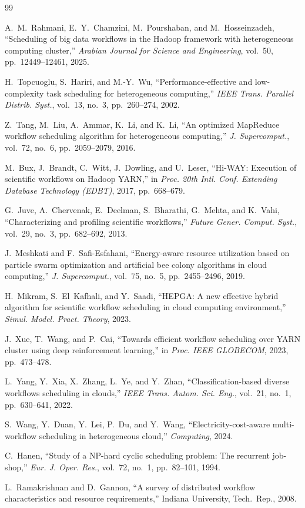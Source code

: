 \documentclass[12pt,a4paper]{article}
\begin{document}
\newpage
\begin{thebibliography}{99}

 A.~M.~Rahmani, E.~Y.~Chamzini, M.~Pourshaban, and M.~Hosseinzadeh, ``Scheduling of big data workflows in the Hadoop framework with heterogeneous computing cluster,'' \textit{Arabian Journal for Science and Engineering}, vol.~50, pp.~12449--12461, 2025.

 H.~Topcuoglu, S.~Hariri, and M.-Y.~Wu, ``Performance-effective and low-complexity task scheduling for heterogeneous computing,'' \textit{IEEE Trans. Parallel Distrib. Syst.}, vol.~13, no.~3, pp.~260--274, 2002.

 Z.~Tang, M.~Liu, A.~Ammar, K.~Li, and K.~Li, ``An optimized MapReduce workflow scheduling algorithm for heterogeneous computing,'' \textit{J. Supercomput.}, vol.~72, no.~6, pp.~2059--2079, 2016.

 M.~Bux, J.~Brandt, C.~Witt, J.~Dowling, and U.~Leser, ``Hi-WAY: Execution of scientific workflows on Hadoop YARN,'' in \textit{Proc. 20th Intl. Conf. Extending Database Technology (EDBT)}, 2017, pp.~668--679.

 G.~Juve, A.~Chervenak, E.~Deelman, S.~Bharathi, G.~Mehta, and K.~Vahi, ``Characterizing and profiling scientific workflows,'' \textit{Future Gener. Comput. Syst.}, vol.~29, no.~3, pp.~682--692, 2013.

 J.~Meshkati and F.~Safi-Esfahani, ``Energy-aware resource utilization based on particle swarm optimization and artificial bee colony algorithms in cloud computing,'' \textit{J. Supercomput.}, vol.~75, no.~5, pp.~2455--2496, 2019.

 H.~Mikram, S.~El~Kafhali, and Y.~Saadi, ``HEPGA: A new effective hybrid algorithm for scientific workflow scheduling in cloud computing environment,'' \textit{Simul. Model. Pract. Theory}, 2023.

 J.~Xue, T.~Wang, and P.~Cai, ``Towards efficient workflow scheduling over YARN cluster using deep reinforcement learning,'' in \textit{Proc. IEEE GLOBECOM}, 2023, pp.~473--478.

 L.~Yang, Y.~Xia, X.~Zhang, L.~Ye, and Y.~Zhan, ``Classification-based diverse workflows scheduling in clouds,'' \textit{IEEE Trans. Autom. Sci. Eng.}, vol.~21, no.~1, pp.~630--641, 2022.

 S.~Wang, Y.~Duan, Y.~Lei, P.~Du, and Y.~Wang, ``Electricity-cost-aware multi-workflow scheduling in heterogeneous cloud,'' \textit{Computing}, 2024.

 C.~Hanen, ``Study of a NP-hard cyclic scheduling problem: The recurrent job-shop,'' \textit{Eur. J. Oper. Res.}, vol.~72, no.~1, pp.~82--101, 1994.

 L.~Ramakrishnan and D.~Gannon, ``A survey of distributed workflow characteristics and resource requirements,'' Indiana University, Tech.\ Rep., 2008.

\end{thebibliography}
\end{document}
